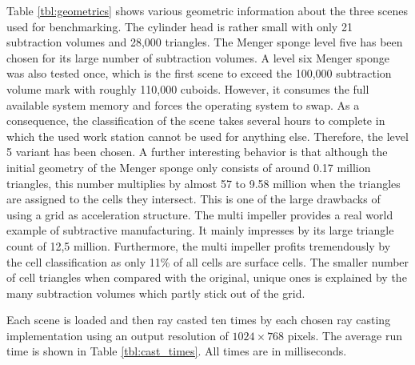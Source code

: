 Table \ref{tbl:geometrics} shows various geometric information about the three scenes used for benchmarking. The cylinder head is rather small with only 21 subtraction volumes and 28,000 triangles. The Menger sponge level five has been chosen for its large number of subtraction volumes. A level six Menger sponge was also tested once, which is the first scene to exceed the 100,000 subtraction volume mark with roughly 110,000 cuboids. However, it consumes the full available system memory and forces the operating system to swap. As a consequence, the classification of the scene takes several hours to complete in which the used work station cannot be used for anything else. Therefore, the level 5 variant has been chosen. A further interesting behavior is that although the initial geometry of the Menger sponge only consists of around 0.17 million triangles, this number multiplies by almost 57 to 9.58 million when the triangles are assigned to the cells they intersect. This is one of the large drawbacks of using a grid as acceleration structure. The multi impeller provides a real world example of subtractive manufacturing. It mainly impresses by its large triangle count of 12,5 million. Furthermore, the multi impeller profits tremendously by the cell classification as only 11\% of all cells are surface cells. The smaller number of cell triangles when compared with the original, unique ones is explained by the many subtraction volumes which partly stick out of the grid.

Each scene is loaded and then ray casted ten times by each chosen ray casting implementation using an output resolution of $1024 \times 768$ pixels. The average run time is shown in Table \ref{tbl:cast_times}. All times are in milliseconds.

